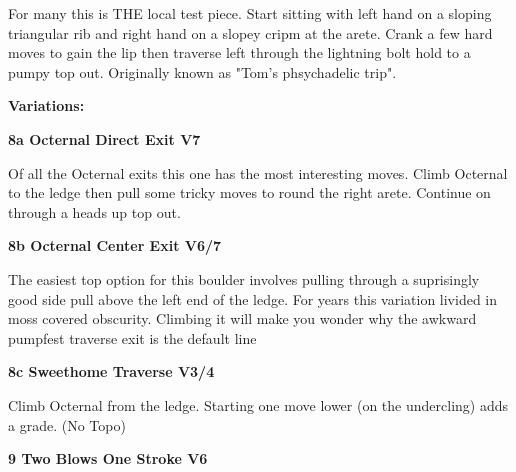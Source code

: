\begin{multicols}{2}
					\begin{adjustwidth}{0.5cm}{}				
					For many this is THE local test piece. Start sitting with left hand on a sloping triangular rib and right hand on a slopey cripm at the arete. Crank a few hard moves to gain the lip then traverse left through the lightning bolt hold to a pumpy top out. Originally known as "Tom's phsychadelic trip".
					\end{adjustwidth}
						\begin{adjustwidth}{0.5cm}{}				
						\textbf{Variations:} \newline
							\label{vr:Octernal Direct Exit}
\colorbox{Goldenrod!50}{
\parbox{0.95\linewidth}{
\textbf{
8a Octernal Direct Exit V7     
}
}
}

							\begin{adjustwidth}{0.5cm}{}				
							Of all the Octernal exits this one has the most interesting moves. Climb Octernal to the ledge then pull some tricky moves to round the right arete. Continue on through a heads up top out.
							\end{adjustwidth}
							\label{vr:Octernal Center Exit}
\colorbox{Goldenrod!50}{
\parbox{0.95\linewidth}{
\textbf{
8b Octernal Center Exit V6/7    
}
}
}

							\begin{adjustwidth}{0.5cm}{}				
							The easiest top option for this boulder involves pulling through a suprisingly good side pull above the left end of the ledge. For years this variation livided in moss covered obscurity. Climbing it will make you wonder why the awkward pumpfest traverse exit is the default line
							\end{adjustwidth}
							\label{vr:Sweethome Traverse}
\colorbox{RoyalBlue!20}{
\parbox{0.95\linewidth}{
\textbf{
8c Sweethome Traverse V3/4    
}
}
}

							\begin{adjustwidth}{0.5cm}{}				
							Climb Octernal from the ledge. Starting one move lower (on the undercling) adds a grade.
								\newline (No Topo) 
							\end{adjustwidth}
						\end{adjustwidth}

					\label{rt:Two Blows One Stroke}
\colorbox{RoyalBlue!20}{
\parbox{0.95\linewidth}{
\textbf{
9 Two Blows One Stroke V6  
}
}
}


\end{multicols}
